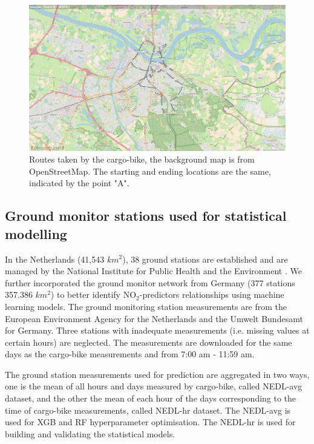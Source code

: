 \documentclass{article}
\begin{document}
\begin{figure}
    \includegraphics[width=\linewidth,trim=4cm 1cm 4cm 1cm, clip=true]{f1b.jpg}
    
    \caption {Routes taken by the cargo-bike, the background map is from OpenStreetMap\citep{openstreetmap}. The starting and ending locations are the same, indicated by the point "A". }
    \label{route}
\end{figure}

\subsection{Ground monitor stations used for statistical modelling}

In the Netherlands (41,543 $km^2$), 38 ground stations are established and are managed by the National Institute for Public Health and the Environment \citep[RIVM,][]{RIVMLML}. We further incorporated the ground monitor network from Germany (377 stations 357.386 $km^2$) to better identify NO$_2$-predictors relationships using machine learning models. The ground monitoring station measurements 
are from the European Environment Agency \citep{EEA} for the Netherlands and the Umwelt Bundesamt \citep{germansource} for Germany. Three stations with inadequate measurements (i.e. missing values at certain hours) are neglected. The measurements are downloaded for the same days as the cargo-bike measurements and from 7:00 am - 11:59 am.  

The ground station measurements used for prediction are aggregated in two ways, one is the mean of all hours and days measured by cargo-bike, called NEDL-avg dataset, and the other the mean of each hour of the days corresponding to the time of cargo-bike measurements, called NEDL-hr dataset. The NEDL-avg is used for XGB and RF hyperparameter optimisation. The NEDL-hr is used for building and validating the statistical models.
\end{document}
